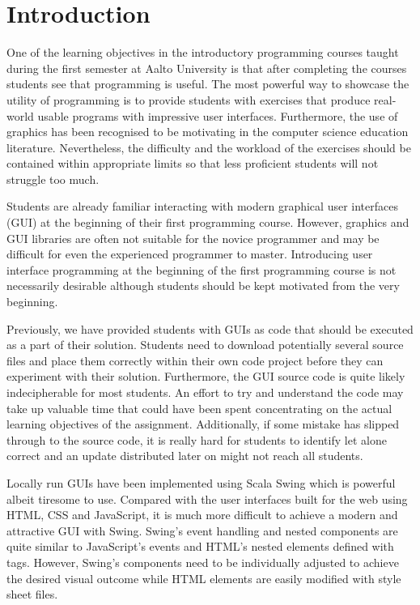 \chapter{Introduction}
\label{chapter:intro}

One of the learning objectives in the introductory programming courses taught during the first semester at Aalto University is that after completing the courses students see that programming is useful. The most powerful way to showcase the utility of programming is to provide students with exercises that produce real-world usable programs with impressive user interfaces. Furthermore, the use of graphics has been recognised to be motivating in the computer science education literature. Nevertheless, the difficulty and the workload of the exercises should be contained within appropriate limits so that less proficient students will not struggle too much.

Students are already familiar interacting with modern graphical user interfaces (GUI) at the beginning of their first programming course. However, graphics and GUI libraries are often not suitable for the novice programmer and may be difficult for even the experienced programmer to master. Introducing user interface programming at the beginning of the first programming course is not necessarily desirable although students should be kept motivated from the very beginning.

Previously, we have provided students with GUIs as code that should be executed as a part of their solution. Students need to download potentially several source files and place them correctly within their own code project before they can experiment with their solution. Furthermore, the GUI source code is quite likely indecipherable for most students. An effort to try and understand the code may take up valuable time that could have been spent concentrating on the actual learning objectives of the assignment. Additionally, if some mistake has slipped through to the source code, it is really hard for students to identify let alone correct and an update distributed later on might not reach all students.

Locally run GUIs have been implemented using Scala Swing which is powerful albeit tiresome to use. Compared with the user interfaces built for the web using HTML, CSS and JavaScript, it is much more difficult to achieve a modern and attractive GUI with Swing. Swing's event handling and nested components are quite similar to JavaScript's events and HTML's nested elements defined with tags. However, Swing's components need to be individually adjusted to achieve the desired visual outcome while HTML elements are easily modified with style sheet files.


